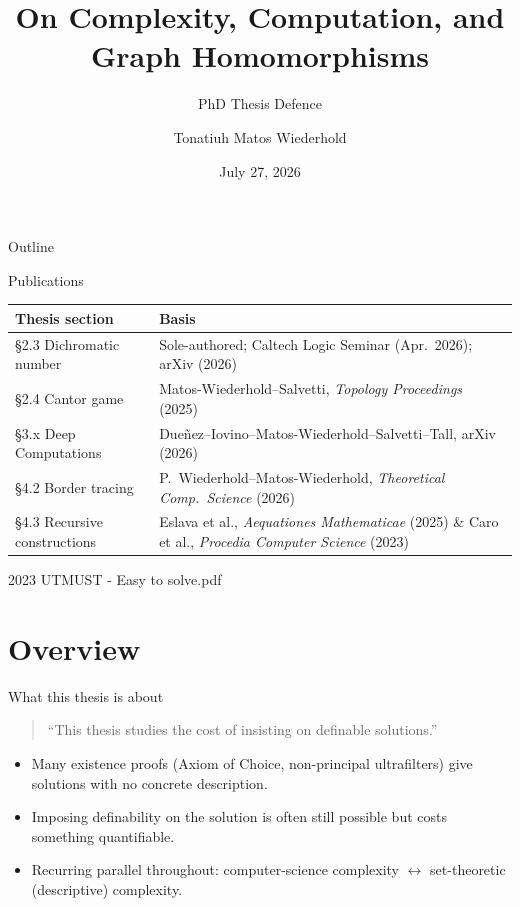 \documentclass[aspectratio=169]{beamer}
\title{On Complexity, Computation, and Graph Homomorphisms}
\subtitle{PhD Thesis Defence}
\author{Tonatiuh Matos Wiederhold}
\institute{Department of Mathematics, University of Toronto \\ Advisors: Spencer Unger, Franklin D. Tall}
\date{July 27, 2026}
\begin{document}
\begin{frame}
  \titlepage
\end{frame}

\begin{frame}{Outline}
  \tableofcontents
\end{frame}

\begin{frame}{Publications}
  \scriptsize
  \begin{tabular}{@{}p{3.3cm}p{8.4cm}@{}}
    \toprule
    \textbf{Thesis section} & \textbf{Basis} \\
    \midrule
    \S2.3 Dichromatic number & Sole-authored; Caltech Logic Seminar (Apr.\ 2026); arXiv (2026) \\
    \S2.4 Cantor game & Matos-Wiederhold--Salvetti, \emph{Topology Proceedings} (2025) \\
    \S3.x Deep Computations & Due\~nez--Iovino--Matos-Wiederhold--Salvetti--Tall, arXiv (2026) \\
    \S4.2 Border tracing & P.~Wiederhold--Matos-Wiederhold, \emph{Theoretical Comp.\ Science} (2026) \\
    \S4.3 Recursive constructions & Eslava et al., \emph{Aequationes Mathematicae} (2025) \& Caro et al., \emph{Procedia Computer Science} (2023) \\
    \bottomrule
  \end{tabular}
\end{frame}


  {2023 UTMUST - Easy to solve.pdf}

\section{Overview}

\begin{frame}{What this thesis is about}
  \begin{quote}
    ``This thesis studies the cost of insisting on definable solutions.''
  \end{quote}
  \begin{itemize}
    \item Many existence proofs (Axiom of Choice, non-principal ultrafilters) give solutions with \alert{no concrete description}.
    \item Imposing definability on the solution is often still possible but costs something quantifiable.
    \item Recurring parallel throughout: \alert{computer-science complexity} $\leftrightarrow$ \alert{set-theoretic (descriptive) complexity}.
  \end{itemize}
\end{frame}
\end{document}
